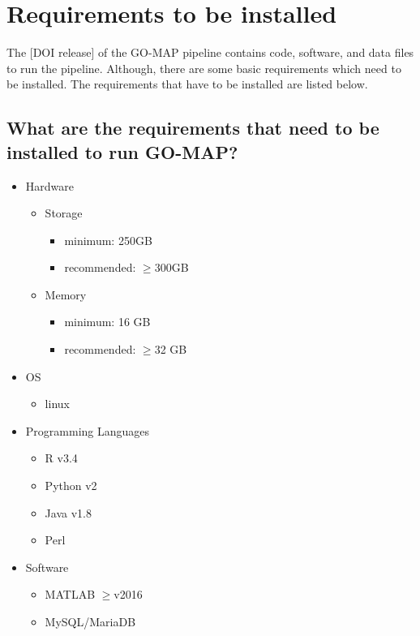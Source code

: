 \section{Requirements to be installed}
\label{sec:requirements}

The [DOI release] of the GO-MAP pipeline contains code, software, and data files to run the pipeline. Although, there are some basic requirements which need to be installed. The requirements that have to be installed are listed below.

\subsection{What are the requirements that need to be installed to run GO-MAP?}
\label{subsec:install_req}

\begin{itemize}
 \item Hardware
 \begin{itemize}
     \item Storage
     \begin{itemize}
         \item minimum: 250GB
         \item recommended: $\geq$300GB
     \end{itemize}
     \item Memory
     \begin{itemize}
         \item minimum: 16 GB
         \item recommended: $\geq$32 GB
     \end{itemize}
 \end{itemize}

 \item OS
 \begin{itemize}
     \item linux
 \end{itemize}
 
 \item Programming Languages
 \begin{itemize}
   \item R v3.4
   \item Python v2
   \item Java v1.8
   \item Perl
 \end{itemize}

 \item Software
 \begin{itemize}
   \item MATLAB $\geq$v2016
   \item MySQL/MariaDB
 \end{itemize}


\end{itemize}

